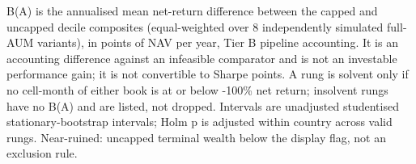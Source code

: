 \begin{table}[t]
\begin{tabular}{lrrrrrrr}
\bottomrule
\end{tabular}
\par\vspace{2pt}
\parbox{\textwidth}{\footnotesize B(A) is the annualised mean net-return difference between the capped and uncapped decile composites (equal-weighted over 8 independently simulated full-AUM variants), in points of NAV per year, Tier B pipeline accounting. It is an accounting difference against an infeasible comparator and is not an investable performance gain; it is not convertible to Sharpe points. A rung is solvent only if no cell-month of either book is at or below -100\% net return; insolvent rungs have no B(A) and are listed, not dropped. Intervals are unadjusted studentised stationary-bootstrap intervals; Holm p is adjusted within country across valid rungs. Near-ruined: uncapped terminal wealth below the display flag, not an exclusion rule.}
\end{table}
